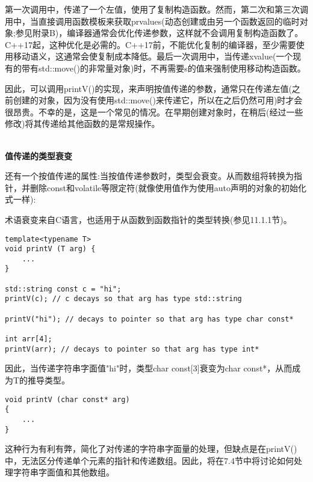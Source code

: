 第一次调用中，传递了一个左值，使用了复制构造函数。然而，第二次和第三次调用中，当直接调用函数模板来获取prvalues(动态创建或由另一个函数返回的临时对象;参见附录B)，编译器通常会优化传递参数，这样就不会调用复制构造函数了。C++17起，这种优化是必需的。C++17前，不能优化复制的编译器，至少需要使用移动语义，这通常会使复制成本降低。最后一次调用中，当传递xvalue(一个现有的带有std::move()的非常量对象)时，不再需要s的值来强制使用移动构造函数。

因此，可以调用printV()的实现，来声明按值传递的参数，通常只在传递左值(之前创建的对象，因为没有使用std::move()来传递它，所以在之后仍然可用)时才会很昂贵。不幸的是，这是一个常见的情况。在早期创建对象时，在稍后(经过一些修改)将其传递给其他函数的是常规操作。

\hspace*{\fill} \\ %
\noindent
\textbf{值传递的类型衰变}

还有一个按值传递的属性:当按值传递参数时，类型会衰变。从而数组将转换为指针，并删除const和volatile等限定符(就像使用值作为使用auto声明的对象的初始化式一样):

\begin{tcolorbox}[colback=webgreen!5!white,colframe=webgreen!75!black]
\hspace*{0.75cm}术语衰变来自C语言，也适用于从函数到函数指针的类型转换(参见11.1.1节)。
\end{tcolorbox}

\begin{lstlisting}[style=styleCXX]
template<typename T>
void printV (T arg) {
	...
}

std::string const c = "hi";
printV(c); // c decays so that arg has type std::string

printV("hi"); // decays to pointer so that arg has type char const*

int arr[4];
printV(arr); // decays to pointer so that arg has type int*
\end{lstlisting}

因此，当传递字符串字面值"hi"时，类型char const[3]衰变为char const*，从而成为T的推导类型。

\begin{lstlisting}[style=styleCXX]
void printV (char const* arg)
{
	...
}
\end{lstlisting}

这种行为有利有弊，简化了对传递的字符串字面量的处理，但缺点是在printV()中，无法区分传递单个元素的指针和传递数组。因此，将在7.4节中将讨论如何处理字符串字面值和其他数组。




